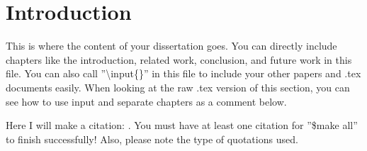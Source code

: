 \newcommand{\tableScale}{0.70}

\newcommand{\singlePic}{0.33}

\newcommand{\singlePicBig}{0.66}

\chapter{Introduction}
This is where the content of your dissertation goes.  You can directly include chapters like the introduction, related work, conclusion, and future work in this file.  You can also call ''\textbackslash input\{\}'' in this file to include your other papers and .tex documents easily.  When looking at the raw .tex version of this section, you can see how to use input and separate chapters as a comment below.

Here I will make a citation: \cite{mobile_marketshare}.  You must have at least one citation for ''\$make all'' to finish successfully!  Also, please note the type of quotations used.

%
